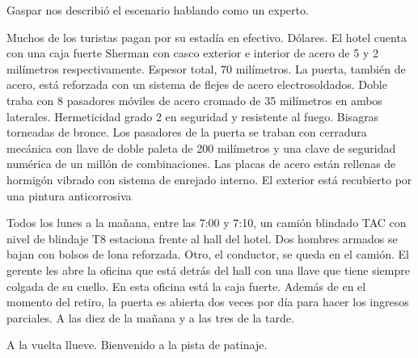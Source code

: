 \documentclass[12pt,twoside,openright,a5paper]{book}
\begin{document}
\vspace{0.5cm}

\hrulefill\hspace{0.2cm} \decofourleft\decofourright \hspace{0.2cm} \hrulefill
\vspace{0.5cm}

Gaspar nos describió el escenario hablando como un experto.

Muchos de los turistas pagan por su estadía en efectivo. Dólares.
El hotel cuenta con una caja fuerte Sherman con casco exterior e interior de
acero de 5 y 2 milímetros respectivamente. Espesor total, 70 milímetros. La
puerta, también de acero, está reforzada con un sistema de flejes de
acero electrosoldados. Doble traba con 8 pasadores móviles de acero
cromado de 35 milímetros en ambos laterales. Hermeticidad grado
2 en seguridad y resistente al fuego. Bisagras torneadas de bronce. Los
pasadores de la puerta se traban con cerradura mecánica con llave de
doble paleta de 200 milímetros y una clave de seguridad numérica de un
millón de combinaciones. Las placas de acero están rellenas de hormigón
vibrado con sistema de enrejado interno. El exterior está recubierto por
una pintura anticorrosiva

Todos los lunes a la mañana, entre las 7:00 y 7:10, un camión blindado
TAC con nivel de blindaje T8 estaciona frente al hall del hotel. Dos hombres
armados se bajan con bolsos de lona reforzada. Otro, el conductor, se queda
en el camión. El gerente les abre la oficina que está detrás del hall con
una llave que tiene siempre colgada de su cuello. En esta oficina está la
caja fuerte. Además de en el momento del retiro, la puerta es abierta dos
veces por día para hacer los ingresos parciales. A las diez de la mañana
y a las tres de la tarde.


\vspace{0.5cm}
\afterpage{}
\hrulefill\hspace{0.2cm} \decofourleft\decofourright \hspace{0.2cm} \hrulefill
\vspace{0.5cm}

A la vuelta llueve. Bienvenido a la pista de patinaje.

\vspace{0.5cm}

\hrulefill\hspace{0.2cm} \decofourleft\decofourright \hspace{0.2cm} \hrulefill
\vspace{0.5cm}
\end{document}
